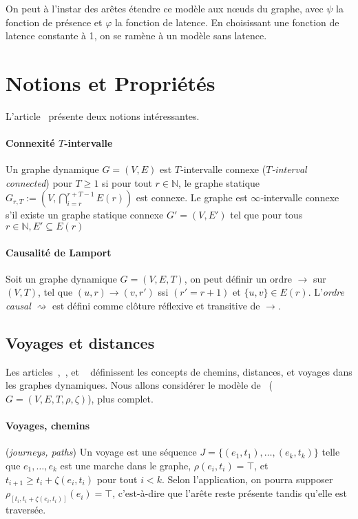 \documentclass[12pt,a4paper]{article}
\begin{document}
On peut à l'instar des arêtes étendre ce modèle aux nœuds du graphe,
avec \(\psi\) la fonction de présence et \(\varphi\) la fonction de
latence. En choisissant une fonction de latence constante à 1, on se
ramène à un modèle sans latence.

\section{Notions et Propriétés}

L'article~\cite{kuhn2010distributed} présente deux notions intéressantes.

\paragraph{Connexité \(T\)‑intervalle}
Un graphe dynamique \(G = (V, E)\) est \(T\)‑intervalle connexe
(\textit{\(T\)‑interval connected}) pour \(T \geq 1\) si pour tout
\(r \in \mathbb{N}\), le graphe statique
\(G_{r,T} := (V, \bigcap_{i=r}^{r+T-1} E(r))\) est connexe. Le graphe
est \(\infty\)‑intervalle connexe s'il existe un graphe statique
connexe \(G' = (V, E')\) tel que pour tous
\(r \in \mathbb{N}, E' \subseteq E(r)\)

\paragraph{Causalité de Lamport}
Soit un graphe dynamique \(G = (V, E, T)\), on peut définir un ordre
\(\rightarrow\) sur \((V, T)\), tel que
\((u, r) \rightarrow (v, r')\) ssi \((r' = r + 1)\) et
\(\{u, v\} \in E(r)\). L'\textit{ordre causal} \(\rightsquigarrow\)
est défini comme clôture réflexive et transitive de \(\rightarrow\).

\subsection{Voyages et distances}

Les articles~\cite{xuan2003computing},~\cite{casteigts2012time}, et
~\cite{latapy2017stream} définissent les concepts de chemins,
distances, et voyages dans les graphes dynamiques. Nous allons
considérer le modèle de~\cite{casteigts2012time}
(\(G = (V, E, T, \rho, \zeta)\)), plus complet.

\paragraph{Voyages, chemins} (\textit{journeys, paths}) Un voyage est
une séquence \(J = \{(e_1, t_1), \dots, (e_k, t_k)\}\) telle que
\({e_1, \dots, e_k}\) est une marche dans le graphe,
\(\rho(e_i, t_i) = \top\), et \(t_{i+1} \geq t_i + \zeta(e_i, t_i)\)
pour tout \(i < k\). Selon l'application, on pourra supposer
\(\rho_{[t_i, t_i + \zeta(e_i, t_i)]}(e_i) = \top\), c'est-à-dire que
l'arête reste présente tandis qu'elle est traversée.
\end{document}
